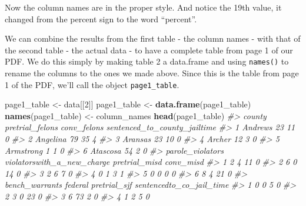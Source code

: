 \documentclass[
  12pt,
]{book}
\newenvironment{Shaded}{\begin{snugshade}}{\end{snugshade}}
\newcommand{\CommentTok}[1]{\textcolor[rgb]{0.56,0.35,0.01}{\textit{#1}}}
\newcommand{\DecValTok}[1]{\textcolor[rgb]{0.00,0.00,0.81}{#1}}
\newcommand{\KeywordTok}[1]{\textcolor[rgb]{0.13,0.29,0.53}{\textbf{#1}}}
\newcommand{\NormalTok}[1]{#1}
\newcommand{\StringTok}[1]{\textcolor[rgb]{0.31,0.60,0.02}{#1}}
\begin{document}
Now the column names are in the proper style. And notice the 19th value, it changed from the percent sign to the word ``percent''.

We can combine the results from the first table - the column names - with that of the second table - the actual data - to have a complete table from page 1 of our PDF. We do this simply by making table 2 a data.frame and using \texttt{names()} to rename the columns to the ones we made above. Since this is the table from page 1 of the PDF, we'll call the object \texttt{page1\_table}.

\begin{Shaded}
\begin{Highlighting}[]
\NormalTok{page1\_table <{-}}\StringTok{ }\NormalTok{data[[}\DecValTok{2}\NormalTok{]]}
\NormalTok{page1\_table <{-}}\StringTok{ }\KeywordTok{data.frame}\NormalTok{(page1\_table)}
\KeywordTok{names}\NormalTok{(page1\_table) <{-}}\StringTok{ }\NormalTok{column\_names}
\KeywordTok{head}\NormalTok{(page1\_table)}
\CommentTok{\#>      county pretrial\_felons conv\_felons sentenced\_to\_county\_jailtime}
\CommentTok{\#> 1   Andrews              23          11                            0}
\CommentTok{\#> 2  Angelina              79          35                            4}
\CommentTok{\#> 3   Aransas              23          10                            0}
\CommentTok{\#> 4    Archer              12           3                            0}
\CommentTok{\#> 5 Armstrong               1           1                            0}
\CommentTok{\#> 6  Atascosa              54           2                            0}
\CommentTok{\#>   parole\_violators violatorswith\_a\_new\_charge pretrial\_misd conv\_misd}
\CommentTok{\#> 1                2                          4            11         0}
\CommentTok{\#> 2                6                          0            14         0}
\CommentTok{\#> 3                2                          6             7         0}
\CommentTok{\#> 4                0                          1             3         1}
\CommentTok{\#> 5                0                          0             0         0}
\CommentTok{\#> 6                8                          4            21         0}
\CommentTok{\#>   bench\_warrants federal pretrial\_sjf sentencedto\_co\_jail\_time}
\CommentTok{\#> 1              0       0            5                        0}
\CommentTok{\#> 2              3       0           23                        0}
\CommentTok{\#> 3              6      73            2                        0}
\CommentTok{\#> 4              1       2            5                        0}

\end{Highlighting}
\end{Shaded}
\end{document}
